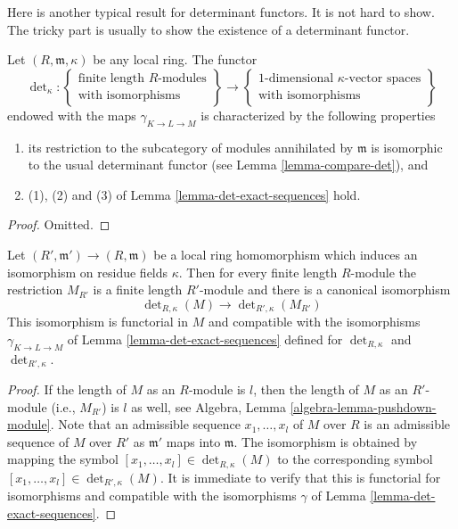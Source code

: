\medskip\noindent
Here is another typical result for determinant functors.
It is not hard to show. The tricky part is usually to show the
existence of a determinant functor.

\begin{lemma}
\label{lemma-uniqueness-det}
Let $(R, \mathfrak m, \kappa)$ be any local ring.
The functor
$$
\det\nolimits_\kappa :
\left\{
\begin{matrix}
\text{finite length }R\text{-modules} \\
\text{with isomorphisms}
\end{matrix}
\right\}
\longrightarrow
\left\{
\begin{matrix}
1\text{-dimensional }\kappa\text{-vector spaces} \\
\text{with isomorphisms}
\end{matrix}
\right\}
$$
endowed with the maps $\gamma_{K \to L \to M}$ is characterized by
the following properties
\begin{enumerate}
\item its restriction to the subcategory of modules annihilated
by $\mathfrak m$ is isomorphic to the usual determinant functor
(see Lemma \ref{lemma-compare-det}), and
\item (1), (2) and (3) of Lemma \ref{lemma-det-exact-sequences}
hold.
\end{enumerate}
\end{lemma}

\begin{proof}
Omitted.
\end{proof}

\begin{lemma}
\label{lemma-determinant-quotient-ring}
Let $(R', \mathfrak m') \to (R, \mathfrak m)$ be a local ring
homomorphism which induces an isomorphism on residue fields $\kappa$.
Then for every finite length $R$-module the restriction $M_{R'}$
is a finite length $R'$-module and there is a canonical isomorphism
$$
\det\nolimits_{R, \kappa}(M)
\longrightarrow
\det\nolimits_{R', \kappa}(M_{R'})
$$
This isomorphism is functorial in $M$ and compatible with the
isomorphisms $\gamma_{K \to L \to M}$ of Lemma \ref{lemma-det-exact-sequences}
defined for $\det_{R, \kappa}$ and $\det_{R', \kappa}$.
\end{lemma}

\begin{proof}
If the length of $M$ as an $R$-module is $l$, then the length
of $M$ as an $R'$-module (i.e., $M_{R'}$) is $l$ as well, see
Algebra, Lemma \ref{algebra-lemma-pushdown-module}.
Note that an admissible sequence $x_1, \ldots, x_l$ of $M$
over $R$ is an admissible sequence of $M$ over $R'$ as $\mathfrak m'$
maps into $\mathfrak m$.
The isomorphism is obtained by mapping the symbol
$[x_1, \ldots, x_l] \in \det\nolimits_{R, \kappa}(M)$
to the corresponding symbol
$[x_1, \ldots, x_l] \in \det\nolimits_{R', \kappa}(M)$.
It is immediate to verify that this is functorial for
isomorphisms and compatible with the isomorphisms
$\gamma$ of Lemma \ref{lemma-det-exact-sequences}.
\end{proof}

